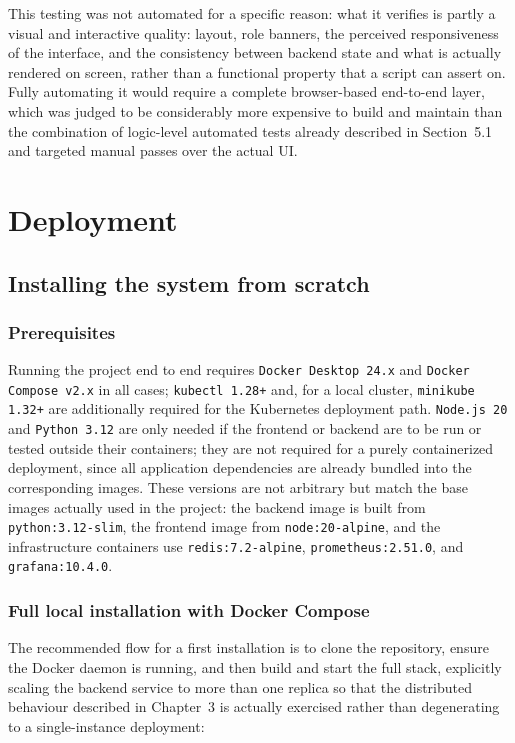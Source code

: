 \documentclass{scrartcl}
\begin{document}
This testing was not automated for a specific reason: what it verifies is partly a visual and interactive quality: layout, role banners, the perceived responsiveness of the interface, and the consistency between backend state and what is actually rendered on screen, rather than a functional property that a script can assert on. Fully automating it would require a complete browser-based end-to-end layer, which was judged to be considerably more expensive to build and maintain than the combination of logic-level automated tests already described in Section~5.1 and targeted manual passes over the actual UI.

\section{Deployment}\label{deployment}

\subsection{Installing the system from scratch}

\subsubsection{Prerequisites}

Running the project end to end requires \texttt{Docker Desktop 24.x} and \texttt{Docker Compose v2.x} in all cases; \texttt{kubectl 1.28+} and, for a local cluster, \texttt{minikube 1.32+} are additionally required for the Kubernetes deployment path. \texttt{Node.js 20} and \texttt{Python 3.12} are only needed if the frontend or backend are to be run or tested outside their containers; they are not required for a purely containerized deployment, since all application dependencies are already bundled into the corresponding images. These versions are not arbitrary but match the base images actually used in the project: the backend image is built from \texttt{python:3.12-slim}, the frontend image from \texttt{node:20-alpine}, and the infrastructure containers use \texttt{redis:7.2-alpine}, \texttt{prometheus:2.51.0}, and \texttt{grafana:10.4.0}.

\subsubsection{Full local installation with Docker Compose}

The recommended flow for a first installation is to clone the repository, ensure the Docker daemon is running, and then build and start the full stack, explicitly scaling the backend service to more than one replica so that the distributed behaviour described in Chapter~3 is actually exercised rather than degenerating to a single-instance deployment:
\end{document}
